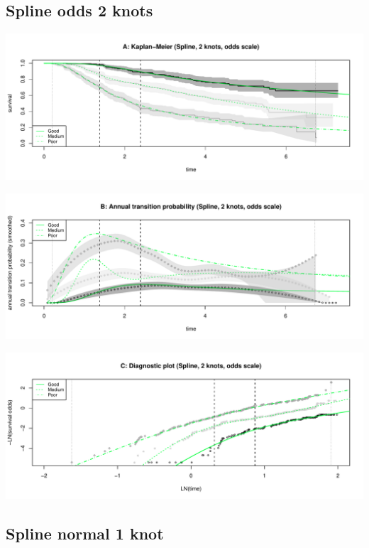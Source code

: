 \documentclass[]{article}
\begin{document}
\subsection{Spline odds 2 knots}\label{spline-odds-2-knots}

\begin{flushleft}\includegraphics[height=0.3\textheight]{images/spline_odds2-1} \end{flushleft}

\begin{flushleft}\includegraphics[height=0.3\textheight]{images/spline_odds2-2} \end{flushleft}

\begin{flushleft}\includegraphics[height=0.3\textheight]{images/spline_odds2-3} \end{flushleft}

\subsection{Spline normal 1 knot}\label{spline-normal-1-knot}
\end{document}
